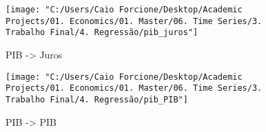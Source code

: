 \documentclass[hidelinks,12pt]{article}
\begin{document}
\begin{figure}[H]
	\centering
	\texttt{[image: "C:/Users/Caio Forcione/Desktop/Academic Projects/01. Economics/01. Master/06. Time Series/3. Trabalho Final/4. Regressão/pib\_juros"]}
	\caption{PIB -> Juros}
	\label{fig:pibjuros}
\end{figure}
	
\begin{figure}[H]
	\centering
	\texttt{[image: "C:/Users/Caio Forcione/Desktop/Academic Projects/01. Economics/01. Master/06. Time Series/3. Trabalho Final/4. Regressão/pib\_PIB"]}
	\caption{PIB -> PIB}
	\label{fig:pibpib}
\end{figure}
	
\end{document}
